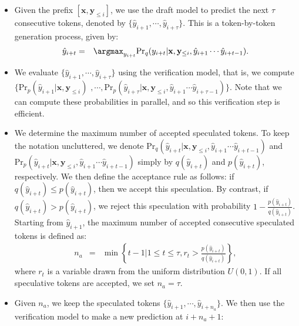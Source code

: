 \begin{itemize}
\item \vspace{0.5em} Given the prefix $[\mathbf{x},\mathbf{y}_{\le i}]$, we use the draft model to predict the next $\tau$ consecutive tokens, denoted by $\{\hat{y}_{i+1},\cdots,\hat{y}_{i+\tau}\}$. This is a token-by-token generation process, given by:
    \begin{eqnarray}
    \hat{y}_{i+t} & = & \argmax_{y_{i+t}} \mathrm{Pr}_q(y_{i+t}|\mathbf{x},\mathbf{y}_{\le i},\hat{y}_{i+1}\cdots\hat{y}_{i+t-1}).
    \end{eqnarray}
\item \vspace{0.3em} We evaluate $\{\hat{y}_{i+1},\cdots,\hat{y}_{i+\tau}\}$ using the verification model, that is, we compute $\{\mathrm{Pr}_p(\hat{y}_{i+1}|\mathbf{x},\mathbf{y}_{\le i})$ $,\cdots,\mathrm{Pr}_p(\hat{y}_{i+\tau}|\mathbf{x},\mathbf{y}_{\le i},\hat{y}_{i+1}\cdots\hat{y}_{i+\tau-1})\}$. Note that we can compute these probabilities in parallel, and so this verification step is efficient.
\item \vspace{0.3em} We determine the maximum number of accepted speculated tokens. To keep the notation uncluttered, we denote $\mathrm{Pr}_q(\hat{y}_{i+t}|\mathbf{x},\mathbf{y}_{\le i},\hat{y}_{i+1}\cdots\hat{y}_{i+t-1})$ and $\mathrm{Pr}_p(\hat{y}_{i+t}|\mathbf{x},\mathbf{y}_{\le i},\hat{y}_{i+1}\cdots\hat{y}_{i+t-1})$ simply by $q(\hat{y}_{i+t})$ and $p(\hat{y}_{i+t})$, respectively. We then define the acceptance rule as follows: if $q(\hat{y}_{i+t}) \le p(\hat{y}_{i+t})$, then we accept this speculation. By contrast, if $q(\hat{y}_{i+t}) > p(\hat{y}_{i+t})$, we reject this speculation with probability $1-\frac{p(\hat{y}_{i+t})}{q(\hat{y}_{i+t})}$. Starting from $\hat{y}_{i+1}$, the maximum number of accepted consecutive speculated tokens is defined as:
    \begin{eqnarray}
    n_a & = & \min \left\{t-1 | 1 \le t \le \tau, r_t > \frac{p(\hat{y}_{i+t})}{q(\hat{y}_{i+t})} \right\},
    \end{eqnarray}
    \noindent where $r_t$ is a variable drawn from the uniform distribution $U(0,1)$. If all speculative tokens are accepted, we set $n_a=\tau$.
\item Given $n_a$, we keep the speculated tokens $\{\hat{y}_{i+1},\cdots,\hat{y}_{i+n_a}\}$. We then use the verification model to make a new prediction at $i+n_a+1$:
    \begin{eqnarray}

\end{eqnarray}
\end{itemize}
